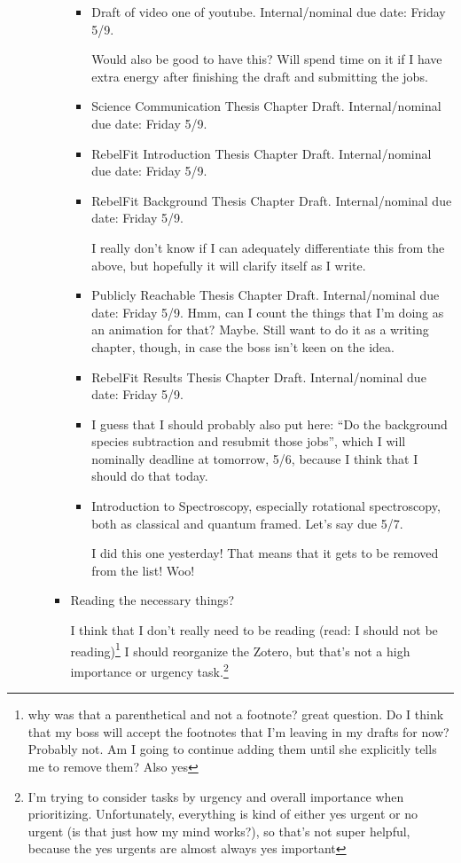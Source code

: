 \documentclass[12pt]{article}
\newcommand{\say}[1]{``#1''}
\renewcommand{\,}{\textsuperscript{,}}
\begin{document}
\begin{enumerate}
\begin{itemize}
\begin{itemize}
\begin{itemize}
\item Draft of video one of youtube. Internal/nominal due date: Friday 5/9.

Would also be good to have this? Will spend time on it if I have extra energy after finishing the draft and submitting the jobs.

\item Science Communication Thesis Chapter Draft. Internal/nominal due date: Friday 5/9.

\item RebelFit Introduction Thesis Chapter Draft. Internal/nominal due date: Friday 5/9.

\item RebelFit Background Thesis Chapter Draft. Internal/nominal due date: Friday 5/9.

I really don't know if I can adequately differentiate this from the above, but hopefully it will clarify itself as I write.

\item Publicly Reachable Thesis Chapter Draft. Internal/nominal due date: Friday 5/9. Hmm, can I count the things that I'm doing as an animation for that?  
Maybe.  
Still want to do it as a writing chapter, though, in case the boss isn't keen on the idea.

\item RebelFit Results Thesis Chapter Draft. Internal/nominal due date: Friday 5/9.

\item I guess that I should probably also put here: \say{Do the background species subtraction and resubmit those jobs}, which I will nominally deadline at tomorrow, 5/6, because I think that I should do that today.

\item Introduction to Spectroscopy, especially rotational spectroscopy, both as classical and quantum framed. Let's say due 5/7.

I did this one yesterday! That means that it gets to be removed from the list! Woo!

\end{itemize}

\item Reading the necessary things?

I think that I don't really need to be reading (read: I should not be reading)\footnote{why was that a parenthetical and not a footnote? great question. Do I think that my boss will accept the footnotes that I'm leaving in my drafts for now? Probably not. Am I going to continue adding them until she explicitly tells me to remove them? Also yes}  
I should reorganize the Zotero, but that's not a high importance or urgency task.\footnote{I'm trying to consider tasks by urgency and overall importance when prioritizing. Unfortunately, everything is kind of either yes urgent or no urgent (is that just how my mind works?), so that's not super helpful, because the yes urgents are almost always yes important}


\end{itemize}
\end{itemize}
\end{enumerate}
\end{document}
